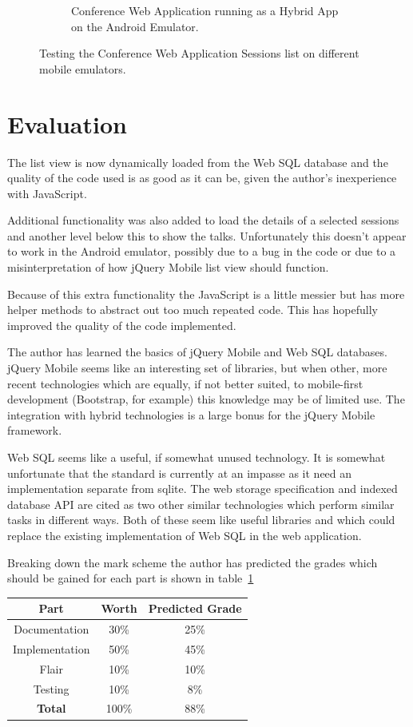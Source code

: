 \documentclass[11pt, a4paper]{article}
\begin{document}
\begin{figure}[p]
\begin{subfigure}[b]{0.4\textwidth}
\caption{Conference Web Application running as a Hybrid App on the Android
         Emulator.}
\end{subfigure}
\caption{Testing the Conference Web Application Sessions list on different
         mobile emulators.}
\label{fig:testing}
\end{figure}


\section{Evaluation}
The list view is now dynamically loaded from the Web SQL database and the
quality of the code used is as good as it can be, given the author's
inexperience with JavaScript.

Additional functionality was also added to load the details of a selected
sessions and another level below this to show the talks. Unfortunately this
doesn't appear to work in the Android emulator, possibly due to a bug in the
code or due to a misinterpretation of how jQuery Mobile list view should
function.

Because of this extra functionality the JavaScript is a little messier but has
more helper methods to abstract out too much repeated code. This has hopefully
improved the quality of the code implemented.

The author has learned the basics of jQuery Mobile and Web SQL databases.
jQuery Mobile seems like an interesting set of libraries, but when other, more
recent technologies which are equally, if not better suited, to mobile-first
development (Bootstrap, for example) this knowledge may be of limited use. The
integration with hybrid technologies is a large bonus for the jQuery Mobile
framework.

Web SQL seems like a useful, if somewhat unused technology. It is somewhat
unfortunate that the standard is currently at an impasse as it need an
implementation separate from sqlite. The web storage specification and indexed
database API are cited as two other similar technologies which perform similar
tasks in different ways. Both of these seem like useful libraries and which
could replace the existing implementation of Web SQL in the web application.

Breaking down the mark scheme the author has predicted the grades which should
be gained for each part is shown in table~\ref{tab:marks}

\begin{table}[p]
\centering
\begin{tabular}{| c | c | c |}\hline
\textbf{Part}	& \textbf{Worth}	& \textbf{Predicted Grade} \\ \hline
Documentation	& 30\%			& 25\% \\ 
Implementation	& 50\%			& 45\% \\ 
Flair		& 10\%			& 10\% \\ 
Testing		& 10\%			& 8\% \\ \hline
\textbf{Total}	& 100\%			& 88\% \\ \hline
\end{tabular}
\label{tab:marks}
\end{table}
\end{document}
